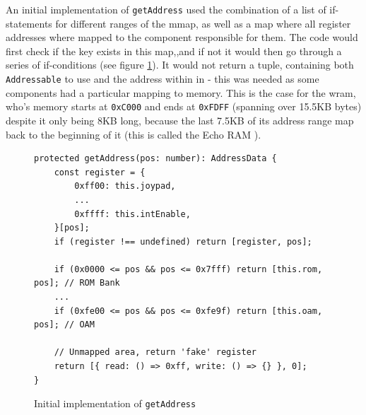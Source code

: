 \documentclass[11pt]{report}
\begin{document}
An initial implementation of \texttt{getAddress} used the combination of a list of if-statements for different ranges of the \gls{mmap}, as well as a map where all register addresses where mapped to the component responsible for them. The code would first check if the key exists in this map,,and if not it would then go through a series of if-conditions  (see figure \ref{fig:getaddress-before}). It would not return a tuple, containing both \texttt{Addressable} to use and the address within in - this was needed as some components had a particular mapping to memory. This is the case for the \gls{wram}, who's memory starts at \texttt{0xC000} and ends at \texttt{0xFDFF} (spanning over 15.5KB bytes) despite it only being 8KB long, because the last 7.5KB of its address range map back to the beginning of it (this is called the Echo RAM \cite{memorymap}).

\begin{figure}[h]
    \begin{verbatim}
protected getAddress(pos: number): AddressData {
    const register = {
        0xff00: this.joypad,
        ...
        0xffff: this.intEnable,
    }[pos];
    if (register !== undefined) return [register, pos];

    if (0x0000 <= pos && pos <= 0x7fff) return [this.rom, pos]; // ROM Bank
    ...
    if (0xfe00 <= pos && pos <= 0xfe9f) return [this.oam, pos]; // OAM

    // Unmapped area, return 'fake' register
    return [{ read: () => 0xff, write: () => {} }, 0];
}
    \end{verbatim}
    \caption{Initial implementation of \texttt{getAddress}}
    \label{fig:getaddress-before}
\end{figure}
\end{document}
